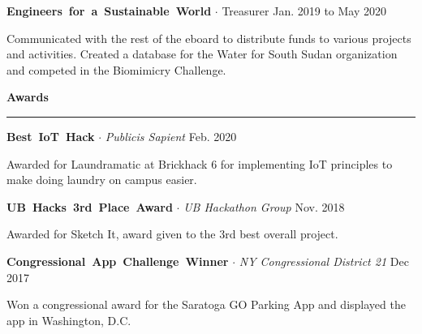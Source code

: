 \documentclass{article}
\newcommand{\rSection}[1] {
  \textcolor{header-blue} {
    \textbf{{\fontsize{0.5cm}{0.45cm}\selectfont \hbox{#1}}} \\
    \rule{0.30\textwidth}{0.1cm}
  }
}
\newcommand{\rSubSubSection}[1] {
  \textbf{{\fontsize{0.35cm}{0.45cm}\selectfont \hbox{#1}}}
}
\begin{document}
\rSubSubSection{Engineers for a Sustainable World} $ \cdot $ Treasurer \hfill Jan. 2019 to May 2020 \par
Communicated with the rest of the eboard to distribute funds to various projects and activities. Created a database for the Water
for South Sudan organization and competed in the Biomimicry Challenge. \par

\rSection{Awards} \par

\rSubSubSection{Best IoT Hack} $ \cdot $ \textit{Publicis Sapient} \hfill Feb. 2020 \par
Awarded for Laundramatic at Brickhack 6 for implementing IoT principles to make doing laundry on campus easier. \par

\rSubSubSection{UB Hacks 3rd Place Award} $ \cdot $ \textit{UB Hackathon Group} \hfill Nov. 2018 \par
Awarded for Sketch It, award given to the 3rd best overall project. \par
\rSubSubSection{Congressional App Challenge Winner} $ \cdot $ \textit{NY Congressional District 21} \hfill Dec 2017 \par
Won a congressional award for the Saratoga GO Parking App and displayed the app in Washington, D.C.
\end{document}
